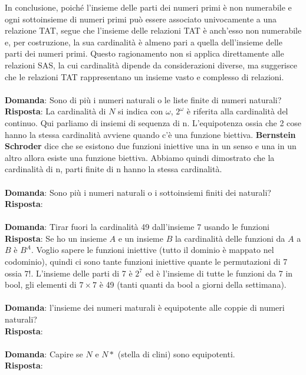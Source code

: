 \documentclass{article}
\begin{document}
In conclusione, poiché l'insieme delle parti dei numeri primi è non numerabile e ogni sottoinsieme di numeri primi può essere associato univocamente a una relazione TAT, segue che l'insieme delle relazioni TAT è anch'esso non numerabile e, per costruzione, la sua cardinalità è almeno pari a quella dell'insieme delle parti dei numeri primi. Questo ragionamento non si applica direttamente alle relazioni SAS, la cui cardinalità dipende da considerazioni diverse, ma suggerisce che le relazioni TAT rappresentano un insieme vasto e complesso di relazioni. \\ \\
\textbf{Domanda}: Sono di più i numeri naturali o le liste finite di numeri naturali? \\
\textbf{Risposta}: La cardinalità di $N$ si indica con $\omega$, $2^\omega$ è riferita alla cardinalità del continuo. Qui parliamo di insiemi di sequenza di n.
L'equipotenza ossia che 2 cose hanno la stessa cardinalità avviene quando c'è una funzione biettiva. \textbf{Bernstein Schroder} dice che se esistono due funzioni iniettive una in un senso e una in un altro allora esiste una funzione biettiva. Abbiamo quindi dimostrato che la cardinalità di n, parti finite di n hanno la stessa cardinalità. \\ \\
\textbf{Domanda}: Sono più i numeri naturali o i sottoinsiemi finiti dei naturali?
\textbf{Risposta}: \\ \\
\textbf{Domanda}: Tirar fuori la cardinalità 49 dall’insieme 7 usando le funzioni \\
\textbf{Risposta}: Se ho un insieme $A$ e un insieme $B$ la cardinalità delle funzioni da $A$ a $B$ è $B^A$. Voglio sapere le funzioni iniettive (tutto il dominio è mappato nel codominio), quindi ci sono tante funzioni iniettive quante le permutazioni di 7 ossia $7!$. L'insieme delle parti di 7 è $2^7$ ed è l'insieme di tutte le funzioni da 7 in bool, gli elementi di $7 \times 7$ è 49 (tanti quanti da bool a giorni della settimana). \\ \\
\textbf{Domanda}: l'insieme dei numeri maturali è equipotente alle coppie di numeri naturali? \\
\textbf{Risposta}: \\ \\
\textbf{Domanda}: Capire se $N$ e $N*$ (stella di clini) sono equipotenti. \\
\textbf{Risposta}: \\ \\
\end{document}
